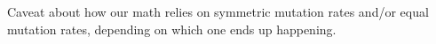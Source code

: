 \documentclass[11pt]{article}
\begin{document}
Caveat about how our math relies on symmetric mutation rates and/or equal mutation rates, depending on which one ends up happening.
	





\end{document}
